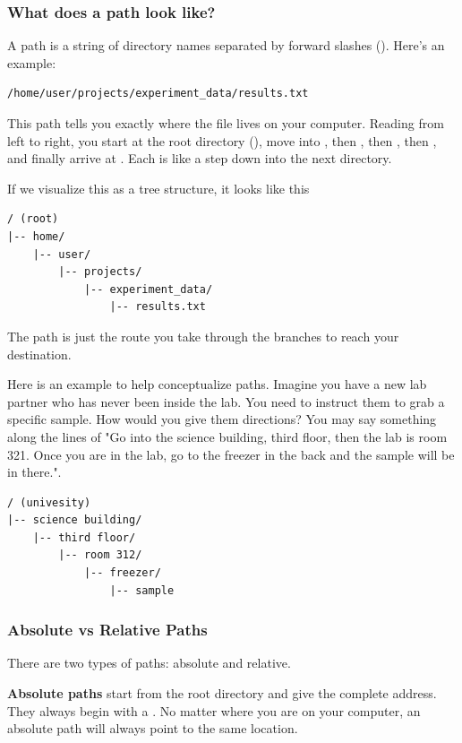\subsubsection{What does a path look like?}

A path is a string of directory names separated by forward slashes (\code{/}). Here's an example:

\begin{lstlisting}
/home/user/projects/experiment_data/results.txt
\end{lstlisting}

This path tells you exactly where the file  lives on your computer. Reading from left to right, you start at the root directory (\code{/}), move into , then , then , then , and finally arrive at . Each \code{/} is like a step down into the next directory.

If we visualize this as a tree structure, it looks like this

\begin{lstlisting}
/ (root)
|-- home/
    |-- user/
        |-- projects/
            |-- experiment_data/
                |-- results.txt
\end{lstlisting}

The path is just the route you take through the branches to reach your destination.

Here is an example to help conceptualize paths. Imagine you have a new lab partner who has never been inside the lab. You need to instruct them to grab a specific sample. How would you give them directions? You may say something along the lines of "Go into the science building, third floor, then the lab is room 321. Once you are in the lab, go to the freezer in the back and the sample will be in there.". 

\begin{lstlisting}
/ (univesity)
|-- science building/
    |-- third floor/
        |-- room 312/
            |-- freezer/
                |-- sample
\end{lstlisting}

\subsubsection{Absolute vs Relative Paths}

There are two types of paths: absolute and relative.

\textbf{Absolute paths} start from the root directory and give the complete address. They always begin with a \code{/}. No matter where you are on your computer, an absolute path will always point to the same location.

